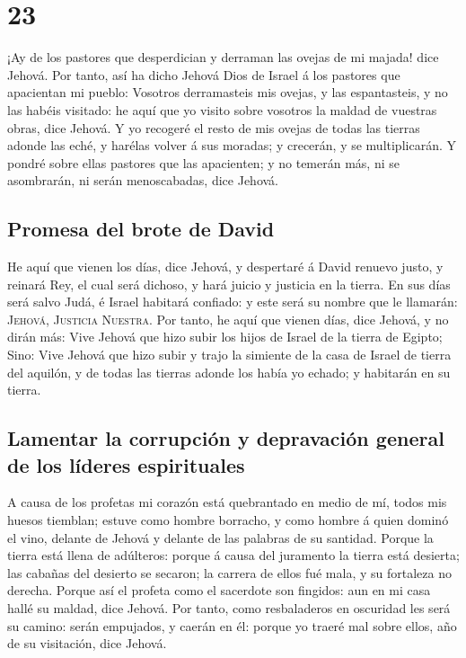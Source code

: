 \hypertarget{section-24-23}{%
\section{23}\label{section-24-23}}

 ¡Ay de los pastores que desperdician y derraman las
ovejas de mi majada! dice Jehová.  Por tanto, así ha dicho
Jehová Dios de Israel á los pastores que apacientan mi pueblo: Vosotros
derramasteis mis ovejas, y las espantasteis, y no las habéis visitado:
he aquí que yo visito sobre vosotros la maldad de vuestras obras, dice
Jehová.  Y yo recogeré el resto de mis ovejas de todas las
tierras adonde las eché, y harélas volver á sus moradas; y crecerán, y
se multiplicarán.  Y pondré sobre ellas pastores que las
apacienten; y no temerán más, ni se asombrarán, ni serán menoscabadas,
dice Jehová.

\hypertarget{promesa-del-brote-de-david}{%
\subsection{Promesa del brote de
David}\label{promesa-del-brote-de-david}}

 He aquí que vienen los días, dice Jehová, y despertaré á
David renuevo justo, y reinará Rey, el cual será dichoso, y hará juicio
y justicia en la tierra.  En sus días será salvo Judá, é
Israel habitará confiado: y este será su nombre que le llamarán:
\textsc{Jehová}, \textsc{Justicia} \textsc{Nuestra}.  Por
tanto, he aquí que vienen días, dice Jehová, y no dirán más: Vive Jehová
que hizo subir los hijos de Israel de la tierra de Egipto;
 Sino: Vive Jehová que hizo subir y trajo la simiente de
la casa de Israel de tierra del aquilón, y de todas las tierras adonde
los había yo echado; y habitarán en su tierra.

\hypertarget{lamentar-la-corrupciuxf3n-y-depravaciuxf3n-general-de-los-luxedderes-espirituales}{%
\subsection{Lamentar la corrupción y depravación general de los líderes
espirituales}\label{lamentar-la-corrupciuxf3n-y-depravaciuxf3n-general-de-los-luxedderes-espirituales}}

 A causa de los profetas mi corazón está quebrantado en
medio de mí, todos mis huesos tiemblan; estuve como hombre borracho, y
como hombre á quien dominó el vino, delante de Jehová y delante de las
palabras de su santidad.  Porque la tierra está llena de
adúlteros: porque á causa del juramento la tierra está desierta; las
cabañas del desierto se secaron; la carrera de ellos fué mala, y su
fortaleza no derecha.  Porque así el profeta como el
sacerdote son fingidos: aun en mi casa hallé su maldad, dice Jehová.
 Por tanto, como resbaladeros en oscuridad les será su
camino: serán empujados, y caerán en él: porque yo traeré mal sobre
ellos, año de su visitación, dice Jehová.

